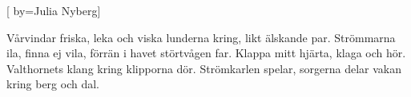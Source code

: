 


[ 	%
	by={Julia Nyberg}]		%
	
\beginverse*		%
Vårvindar friska, leka och viska
lunderna kring, likt älskande par.
Strömmarna ila, finna ej vila,
förrän i havet störtvågen far.
Klappa mitt hjärta, klaga och hör.
Valthornets klang kring klipporna dör.
Strömkarlen spelar, sorgerna delar
vakan kring berg och dal.
\endverse			%
\endsong			%
